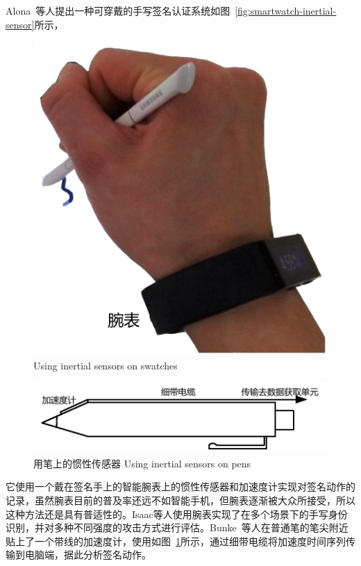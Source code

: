 Alona~\cite{Levy2018Handwritten}等人提出一种可穿戴的手写签名认证系统如图~\ref{fig:smartwatch-inertial-sensor}所示，
\begin{figure}
  \centering
  \begin{minipage}[t]{0.3\textwidth}
    \centering
    \includegraphics[width=\textwidth]{figure/smartwatch.pdf}
      {Using inertial sensors on swatches}
        \label{fig:smartwatch-inertial-sensor}
  \end{minipage}
  \centering
  \begin{minipage}[t]{0.49\textwidth}
    \centering
    \includegraphics[width=\textwidth]{figure/acceleration-pen.pdf}
    \bicaption
    {用笔上的惯性传感器}
    {Using inertial sensors on pens}
    \label{fig:pen-inertial-sensor}
   \end{minipage}
\end{figure}
它使用一个戴在签名手上的智能腕表上的惯性传感器和加速度计实现对签名动作的记录，虽然腕表目前的普及率还远不如智能手机，但腕表逐渐被大众所接受，所以这种方法还是具有普适性的。Isaac\cite{8698222}等人使用腕表实现了在多个场景下的手写身份识别，并对多种不同强度的攻击方式进行评估。Bunke~\cite{Bunke2015Online}等人在普通笔的笔尖附近贴上了一个带线的加速度计，使用如图~\ref{fig:pen-inertial-sensor}所示，通过细带电缆将加速度时间序列传输到电脑端，据此分析签名动作。


